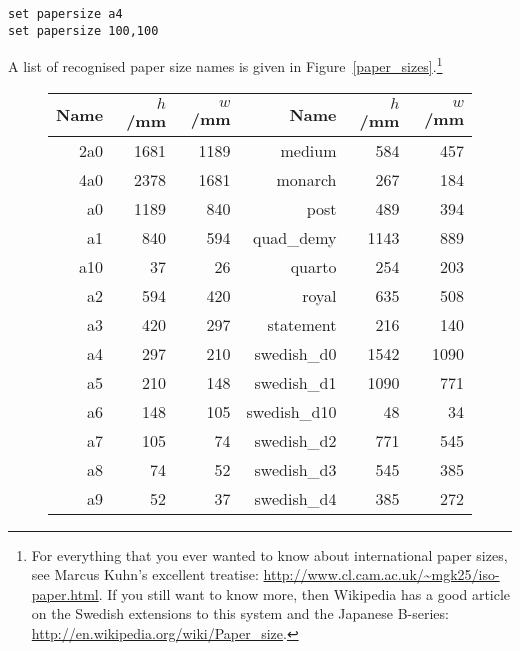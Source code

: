 \begin{verbatim}
set papersize a4
set papersize 100,100
\end{verbatim}

\noindent A list of recognised paper size names is given in
Figure~\ref{paper_sizes}.\footnote{For everything that you ever wanted to know
about international paper sizes, see Marcus Kuhn's excellent treatise:
\url{http://www.cl.cam.ac.uk/~mgk25/iso-paper.html}. If you still want to know
more, then Wikipedia has a good article on the Swedish extensions to this
system and the Japanese B-series:
\url{http://en.wikipedia.org/wiki/Paper_size}.}

\begin{figure}
\tiny \center
\begin{tabular}{|rrr|rrr|}
\hline
{\bf Name} & {\bf $h$/mm} & {\bf $w$/mm} & {\bf Name} & {\bf $h$/mm} & {\bf $w$/mm} \\
\hline
                       2a0 &   1681 &   1189 &           medium &    584 &    457 \\
                       4a0 &   2378 &   1681 &          monarch &    267 &    184 \\
                        a0 &   1189 &    840 &             post &    489 &    394 \\
                        a1 &    840 &    594 &        quad\_demy &   1143 &   889 \\
                       a10 &     37 &     26 &           quarto &    254 &    203 \\
                        a2 &    594 &    420 &            royal &    635 &    508 \\
                        a3 &    420 &    297 &        statement &    216 &    140 \\
                        a4 &    297 &    210 &       swedish\_d0 &   1542 &   1090 \\
                        a5 &    210 &    148 &       swedish\_d1 &   1090 &    771 \\
                        a6 &    148 &    105 &      swedish\_d10 &     48 &     34 \\
                        a7 &    105 &     74 &       swedish\_d2 &    771 &    545 \\
                        a8 &     74 &     52 &       swedish\_d3 &    545 &    385 \\
                        a9 &     52 &     37 &       swedish\_d4 &    385 &    272 \\

\end{tabular}
\end{figure}
